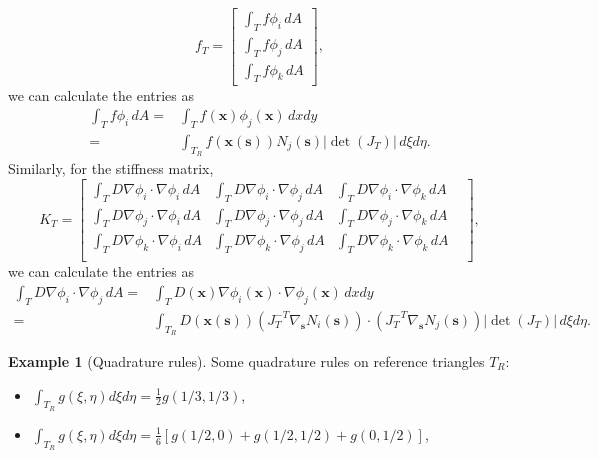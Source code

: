 \documentclass[12pt, a4paper]{article}
\renewcommand{\vec}[1]{\mathbf{#1}}
\theoremstyle{definition}
\newtheorem{example}[thm]{Example}
\theoremstyle{remark}
\numberwithin{equation}{section}
\begin{document}
\begin{equation*}
f_{T}=
\begin{bmatrix}
\int_{T} f \phi_i \, dA\\
\int_{T} f \phi_{j} \, dA\\
\int_{T} f \phi_{k} \, dA
\end{bmatrix},
\end{equation*}
we can calculate the entries as
\begin{align*}
\int_{T} f \phi_i \, dA = &\int_{T}f(\vec{x})\phi_j(\vec{x})\, dxdy\\
=&\int_{T_R} f(\vec{x}(\vec{s}))N_j(\vec{s})|\operatorname{det}(J_T)|\, d\xi d \eta.
\end{align*}
Similarly, for the stiffness matrix, 
\begin{equation*}
K_{T}=
\begin{bmatrix}
\int_{T} D\nabla\phi_i\cdot\nabla\phi_i \, dA&
\int_{T} D\nabla\phi_i\cdot\nabla\phi_j \, dA&
\int_{T} D\nabla\phi_i\cdot\nabla\phi_k \, dA&\\
\int_{T} D\nabla\phi_j\cdot\nabla\phi_i \, dA&
\int_{T} D\nabla\phi_j\cdot\nabla\phi_j \, dA&
\int_{T} D\nabla\phi_j\cdot\nabla\phi_k \, dA&\\
\int_{T} D\nabla\phi_k\cdot\nabla\phi_i \, dA&
\int_{T} D\nabla\phi_k\cdot\nabla\phi_j \, dA&
\int_{T} D\nabla\phi_k\cdot\nabla\phi_k \, dA&\\
\end{bmatrix},
\end{equation*}
we can calculate the entries as
\begin{align*}
\int_{T}  D\nabla\phi_i\cdot\nabla\phi_j \, dA 
= &\int_{T} D(\vec{x})\nabla\phi_i(\vec{x})\cdot\nabla\phi_j(\vec{x})\, dxdy\\
= &\int_{T_R} D(\vec{x}(\vec{s}))\left(J_T^{-T}\nabla_{\vec{s}}N_i(\vec{s})\right)\cdot\left(J_T^{-T}\nabla_{\vec{s}} N_j(\vec{s})\right)|\operatorname{det}(J_T)|\, d\xi d\eta.
\end{align*}



\begin{example}[Quadrature rules]
Some quadrature rules on reference triangles $T_R$:
\begin{itemize}
	\item $\int_{T_R}g(\xi,\eta)d\xi d\eta = \frac{1}{2}g(1/3,1/3)$,
	
	\item $\int_{T_R}g(\xi,\eta)d\xi d\eta =
	 \frac{1}{6}\left[g(1/2,0) + g(1/2,1/2) + g(0, 1/2)\right]$,

\end{itemize}

\end{example}
\end{document}
